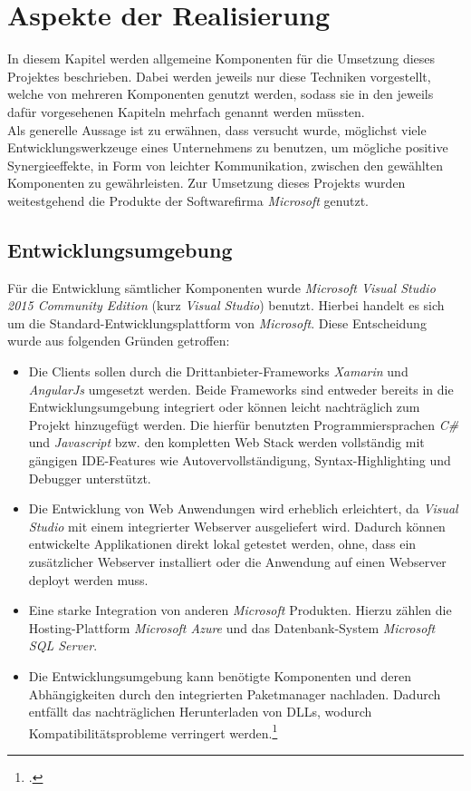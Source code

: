 \chapter{Aspekte der Realisierung}
\label{cha:realisierung}
In diesem Kapitel werden allgemeine Komponenten für die Umsetzung dieses Projektes beschrieben. Dabei werden jeweils nur diese Techniken vorgestellt, welche von mehreren Komponenten genutzt werden, sodass sie in den jeweils dafür vorgesehenen Kapiteln mehrfach genannt werden müssten. \\
Als generelle Aussage ist zu erwähnen, dass versucht wurde, möglichst viele Entwicklungswerkzeuge eines Unternehmens zu benutzen, um mögliche positive Synergieeffekte, in Form von leichter Kommunikation, zwischen den gewählten Komponenten zu gewährleisten. Zur Umsetzung dieses Projekts wurden weitestgehend die Produkte der Softwarefirma \textit{Microsoft} genutzt.

\section{Entwicklungsumgebung}
\label{sec:entwicklungsumgebung}
Für die Entwicklung sämtlicher Komponenten wurde \textit{Microsoft Visual Studio 2015 Community Edition} (kurz \textit{Visual Studio}) benutzt. Hierbei handelt es sich um die Standard-Entwicklungsplattform von \textit{Microsoft}. Diese Entscheidung wurde aus folgenden Gründen getroffen:
\begin{itemize}
\item Die Clients sollen durch die Drittanbieter-Frameworks \textit{Xamarin} und \textit{AngularJs} umgesetzt werden. Beide Frameworks sind entweder bereits in die Entwicklungsumgebung integriert oder können leicht nachträglich zum Projekt hinzugefügt werden. Die hierfür benutzten Programmiersprachen \textit{C\#} und \textit{Javascript} bzw. den kompletten \ac{Web Stack} werden vollständig mit gängigen \ac{IDE}-Features wie Autovervollständigung, Syntax-Highlighting und Debugger unterstützt. 
\item Die Entwicklung von Web Anwendungen wird erheblich erleichtert, da \textit{Visual Studio} mit einem integrierter Webserver ausgeliefert wird. Dadurch können entwickelte Applikationen direkt lokal getestet werden, ohne, dass ein zusätzlicher Webserver installiert oder die Anwendung auf einen Webserver deployt werden muss.
\item Eine starke Integration von anderen \textit{Microsoft} Produkten. Hierzu zählen die Hosting-Plattform \textit{Microsoft Azure} und das Datenbank-System \textit{Microsoft SQL Server}.
\item Die Entwicklungsumgebung kann benötigte Komponenten und deren Abhängigkeiten durch den integrierten Paketmanager nachladen. Dadurch entfällt das nachträglichen Herunterladen von DLLs, wodurch Kompatibilitätsprobleme verringert werden.\footcite{online:VisualStudio}
\end{itemize}
